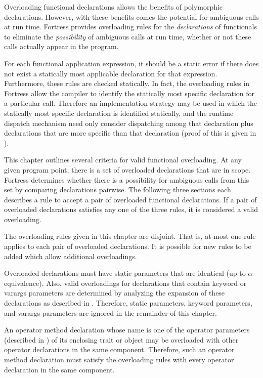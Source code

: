 Overloading functional declarations allows the benefits of polymorphic
declarations.  However, with these benefits comes the potential for
ambiguous calls at run time.  Fortress provides overloading rules for the
\emph{declarations} of functionals to eliminate the \emph{possibility}
of ambiguous calls at run time, whether or not these calls actually
appear in the program.

For each functional application expression, it should be a static error
if there does not exist a statically most applicable declaration for
that expression.
Furthermore, these rules are checked statically.
In fact, the overloading rules
in Fortress allow the compiler to identify the
statically most specific declaration for a particular call.  Therefore
an implementation strategy may be used in which the statically most
specific declaration is identified statically, and the runtime
dispatch mechanism need only consider dispatching among that
declaration plus declarations that are more specific than that
declaration (proof of this is given in ).

This chapter outlines several criteria for valid functional
overloading.  At any given program point, there is a set of overloaded
declarations that are in scope.  Fortress determines whether there is
a possibility for ambiguous calls from this set by comparing
declarations pairwise.  The following three sections each describes a
rule to accept a pair of overloaded functional declarations.  If a
pair of overloaded declarations satisfies any one of the three rules,
it is considered a valid overloading.

The overloading rules given in this chapter are disjoint.  That is, at
most one rule applies to each pair of overloaded declarations.  It is
possible for new rules to be added which allow additional
overloadings.

\label{adv-over-kwd}
Overloaded declarations must have static parameters that are identical
(up to $\alpha$-equivalence).  Also, valid overloadings for
declarations that contain keyword or
varargs parameters are determined
by analyzing the expansion of these declarations as described in
.  Therefore, static
parameters, keyword parameters,
and varargs parameters are ignored in
the remainder of this chapter.

An operator method declaration whose name is one of the operator parameters
(described in )
of its enclosing trait or object may be overloaded with other operator
declarations in the same component.  Therefore, such an operator method
declaration must satisfy the overloading rules
with every operator declaration in the same component.



